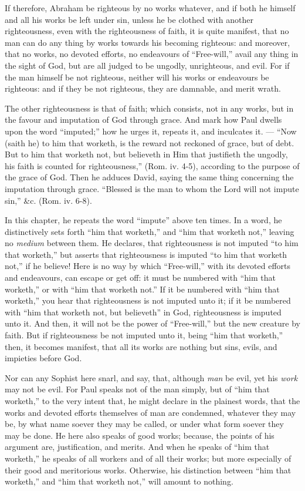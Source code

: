 If therefore, Abraham be righteous by no works whatever, and if both he himself and all his works be left under sin, unless he be clothed with another righteousness, even with the righteousness of faith, it is quite manifest, that no man can do any thing by works towards his becoming righteous: and moreover, that no works, no devoted efforts, no endeavours of “Free-will,” avail any thing in the sight of God, but are all judged to be ungodly, unrighteous, and evil. For if the man himself be not righteous, neither will his works or endeavours be righteous: and if they be not righteous, they are damnable, and merit wrath.

The other righteousness is that of faith; which consists, not in any works, but in the favour and imputation of God through grace. And mark how Paul dwells upon the word “imputed;” how he urges it, repeats it, and inculcates it. — “Now (saith he) to him that worketh, is the reward not reckoned of grace, but of debt. But to him that worketh not, but believeth in Him that justifieth the ungodly, his faith is counted for righteousness,” (Rom. iv. 4-5), according to the purpose of the grace of God. Then he adduces David, saying the same thing concerning the imputation through grace. “Blessed is the man to whom the Lord will not impute sin,” \&c. (Rom. iv. 6-8).

In this chapter, he repeats the word “impute” above ten times. In a word, he distinctively sets forth “him that worketh,” and “him that worketh not,” leaving no \emph{medium }between them. He declares, that righteousness is not imputed “to him that worketh,” but asserts that righteousness is imputed “to him that worketh not,” if he believe! Here is no way by which “Free-will,” with its devoted efforts and endeavours, can escape or get off: it must be numbered with “him that worketh,” or with “him that worketh not.” If it be numbered with “him that worketh,” you hear that righteousness is not imputed unto it; if it be numbered with “him that worketh not, but believeth” in God, righteousness is imputed unto it. And then, it will not be the power of “Free-will,” but the new creature by faith. But if righteousness be not imputed unto it, being “him that worketh,” then, it becomes manifest, that all its works are nothing but sins, evils, and impieties before God.

Nor can any Sophist here snarl, and say, that, although \emph{man }be evil, yet his \emph{work }may not be evil. For Paul speaks not of the man simply, but of “him that worketh,” to the very intent that, he might declare in the plainest words, that the works and devoted efforts themselves of man are condemned, whatever they may be, by what name soever they may be called, or under what form soever they may be done. He here also speaks of good works; because, the points of his argument are, justification, and merits. And when he speaks of “him that worketh,” he speaks of all workers and of all their works; but more especially of their good and meritorious works. Otherwise, his distinction between “him that worketh,” and “him that worketh not,” will amount to nothing.

